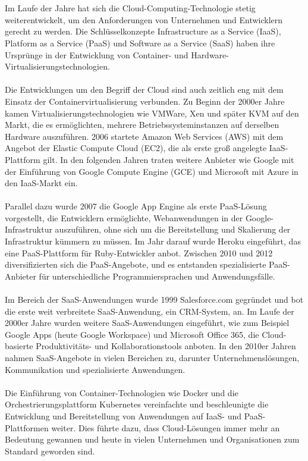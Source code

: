 \documentclass[../vs-script-first-v01.tex]{subfiles}
\begin{document}
\\\\
Im Laufe der Jahre hat sich die Cloud-Computing-Technologie stetig weiterentwickelt, um den Anforderungen von Unternehmen und Entwicklern gerecht zu werden. Die Schlüsselkonzepte Infrastructure as a Service (IaaS), Platform as a Service (PaaS) und Software as a Service (SaaS) haben ihre Ursprünge in der Entwicklung von Container- und Hardware-Virtualisierungstechnologien.
\\\\
Die Entwicklungen um den Begriff der Cloud sind auch zeitlich eng mit dem Einsatz der Containervirtualisierung verbunden. Zu Beginn der 2000er Jahre kamen Virtualisierungstechnologien wie VMWare, Xen und später KVM auf den Markt, die es ermöglichten, mehrere Betriebssysteminstanzen auf derselben Hardware auszuführen. 2006 startete Amazon Web Services (AWS) mit dem Angebot der Elastic Compute Cloud (EC2), die als erste groß angelegte IaaS-Plattform gilt. In den folgenden Jahren traten weitere Anbieter wie Google mit der Einführung von Google Compute Engine (GCE) und Microsoft mit Azure in den IaaS-Markt ein.
\\\\
Parallel dazu wurde 2007 die Google App Engine als erste PaaS-Lösung vorgestellt, die Entwicklern ermöglichte, Webanwendungen in der Google-Infrastruktur auszuführen, ohne sich um die Bereitstellung und Skalierung der Infrastruktur kümmern zu müssen. Im Jahr darauf wurde Heroku eingeführt, das eine PaaS-Plattform für Ruby-Entwickler anbot. Zwischen 2010 und 2012 diversifizierten sich die PaaS-Angebote, und es entstanden spezialisierte PaaS-Anbieter für unterschiedliche Programmiersprachen und Anwendungsfälle.
\\\\
Im Bereich der SaaS-Anwendungen wurde 1999 Salesforce.com gegründet und bot die erste weit verbreitete SaaS-Anwendung, ein CRM-System, an. Im Laufe der 2000er Jahre wurden weitere SaaS-Anwendungen eingeführt, wie zum Beispiel Google Apps (heute Google Workspace) und Microsoft Office 365, die Cloud-basierte Produktivitäts- und Kollaborationstools anboten. In den 2010er Jahren nahmen SaaS-Angebote in vielen Bereichen zu, darunter Unternehmenslösungen, Kommunikation und spezialisierte Anwendungen.
\\\\
Die Einführung von Container-Technologien wie Docker und die Orchestrierungsplattform Kubernetes  vereinfachte und beschleunigte die Entwicklung und Bereitstellung von Anwendungen auf IaaS- und PaaS-Plattformen weiter. Dies führte dazu, dass Cloud-Lösungen immer mehr an Bedeutung gewannen und heute in vielen Unternehmen und Organisationen zum Standard geworden sind.
\end{document}
